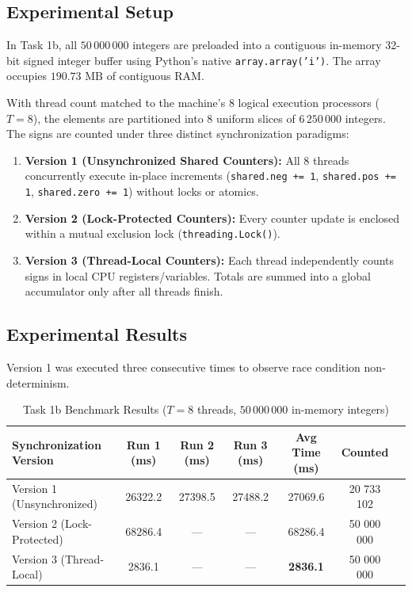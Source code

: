 \documentclass{labreport}
\begin{document}
\subsection{Experimental Setup}
In Task 1b, all $50\,000\,000$ integers are preloaded into a contiguous in-memory 32-bit signed integer buffer using Python's native \texttt{array.array('i')}. The array occupies $190.73\text{ MB}$ of contiguous RAM.

With thread count matched to the machine's 8 logical execution processors ($T = 8$), the elements are partitioned into 8 uniform slices of $6\,250\,000$ integers. The signs are counted under three distinct synchronization paradigms:
\begin{enumerate}
    \item \textbf{Version 1 (Unsynchronized Shared Counters):} All 8 threads concurrently execute in-place increments (\texttt{shared.neg += 1}, \texttt{shared.pos += 1}, \texttt{shared.zero += 1}) without locks or atomics.
    \item \textbf{Version 2 (Lock-Protected Counters):} Every counter update is enclosed within a mutual exclusion lock (\texttt{threading.Lock()}).
    \item \textbf{Version 3 (Thread-Local Counters):} Each thread independently counts signs in local CPU registers/variables. Totals are summed into a global accumulator only after all threads finish.
\end{enumerate}

\subsection{Experimental Results}
Version 1 was executed three consecutive times to observe race condition non-determinism.

\begin{table}[H]
\centering
\small
\caption{Task 1b Benchmark Results ($T = 8$ threads, $50\,000\,000$ in-memory integers)}
\label{tab:task1b_results}
\begin{tabular}{lcccccc}
\toprule
\textbf{Synchronization Version} & \textbf{Run 1 (ms)} & \textbf{Run 2 (ms)} & \textbf{Run 3 (ms)} & \textbf{Avg Time (ms)} & \textbf{Counted} \\
\midrule
Version 1 (Unsynchronized) & 26322.2 & 27398.5 & 27488.2 & 27069.6 & 20 733 102 \\
Version 2 (Lock-Protected)  & 68286.4 & --- & --- & 68286.4 & 50 000 000 \\
Version 3 (Thread-Local)    & 2836.1 & --- & --- & \textbf{2836.1} & 50 000 000 \\
\bottomrule
\end{tabular}
\end{table}
\end{document}
